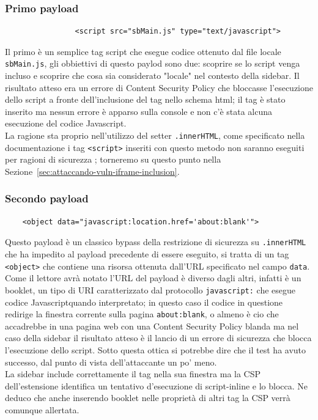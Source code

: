 \documentclass{sapthesis}
\newcommand{\code}[1]{\texttt{#1}}
\newcommand{\file}[1]{\code{#1}}
\newcommand{\attr}[1]{\code{.#1}}
\newcommand{\refSection}[1]{Sezione~\ref{#1}}
\newcommand{\JS}{Javascript}
\begin{document}
        \subsubsection{Primo payload}
            \begin{lstlisting}
                <script src="sbMain.js" type="text/javascript">
            \end{lstlisting}
            Il primo è un semplice tag script che esegue codice ottenuto dal file locale \file{sbMain.js},
            gli obbiettivi di questo paylod sono due: scoprire se lo script venga incluso e scoprire che 
            cosa sia considerato "locale" nel contesto della sidebar. Il risultato atteso era un errore
            di Content Security Policy che bloccasse l'esecuzione dello script a fronte dell'inclusione del
            tag nello schema html; il tag è stato inserito ma nessun errore è apparso sulla console e non
            c'è stata alcuna esecuzione del codice \JS.\\
            La ragione sta proprio nell'utilizzo del setter \attr{innerHTML}, come specificato nella
            documentazione i tag \code{<script>} inseriti con questo metodo non saranno eseguiti per
            ragioni di sicurezza \cite{innerHTML}; torneremo su questo punto nella \refSection{sec:attaccando-vuln-iframe-inclusion}.

        \subsubsection{Secondo payload}
            \begin{lstlisting}
    <object data="javascript:location.href='about:blank'">
            \end{lstlisting}
            Questo payload è un classico bypass della restrizione di sicurezza su \attr{innerHTML} che ha impedito al
            payload precedente di essere eseguito, si tratta di un tag \code{<object>} che contiene una risorsa
            ottenuta dall'URL specificato nel campo \code{data}. Come il lettore avrà notato l'URL del payload
            è diverso dagli altri, infatti è un booklet, un tipo di URI caratterizzato dal protocollo \code{javascript:}
            che esegue codice \JS quando interpretato; in questo caso il codice in questione redirige
            la finestra corrente sulla pagina \code{about:blank}, o almeno è cio che accadrebbe in una pagina web
            con una Content Security Policy blanda ma nel caso della sidebar il risultato atteso è il lancio
            di un errore di sicurezza che blocca l'esecuzione dello script. Sotto questa ottica si potrebbe dire che
            il test ha avuto successo, dal punto di vista dell'attaccante un po' meno.\\
            La sidebar include correttamente il tag nella sua finestra ma la CSP dell'estensione identifica un tentativo
            d'esecuzione di script-inline e lo blocca. Ne deduco che anche inserendo booklet nelle proprietà di
            altri tag la CSP verrà comunque allertata.
\end{document}
